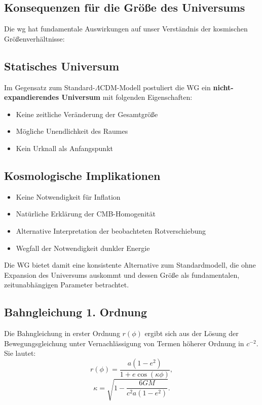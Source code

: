 \subsection{Konsequenzen für die Größe des Universums}
Die \gls{wg} hat fundamentale Auswirkungen auf unser Verständnis der kosmischen Größenverhältnisse:

\subsection{Statisches Universum}
Im Gegensatz zum Standard-$\Lambda$CDM-Modell postuliert die WG ein \textbf{nicht-expandierendes Universum} mit folgenden Eigenschaften:

\begin{itemize}
\item Keine zeitliche Veränderung der Gesamtgröße
\item Mögliche Unendlichkeit des Raumes
\item Kein Urknall als Anfangspunkt
\end{itemize}

\subsection{Kosmologische Implikationen}
\begin{itemize}
\item Keine Notwendigkeit für Inflation
\item Natürliche Erklärung der CMB-Homogenität
\item Alternative Interpretation der beobachteten Rotverschiebung
\item Wegfall der Notwendigkeit dunkler Energie
\end{itemize}

Die WG bietet damit eine konsistente Alternative zum Standardmodell, die ohne Expansion des Universums auskommt und dessen Größe als fundamentalen, zeitunabhängigen Parameter betrachtet.


\subsection{Bahngleichung 1. Ordnung}
Die Bahngleichung in erster Ordnung $r(\phi)$ ergibt sich aus der Lösung der Bewegungsgleichung unter Vernachlässigung von Termen höherer Ordnung in $c^{-2}$. Sie lautet:
\begin{equation}
    \label{eq:weber_r_1_ordnung}
    r(\phi) = \frac{a(1 - e^2)}{1 + e \cos(\kappa \phi)},    
\end{equation}
\begin{equation}
    \kappa = \sqrt{1 - \frac{6GM}{c^2 a(1 - e^2)}}.
\end{equation}

